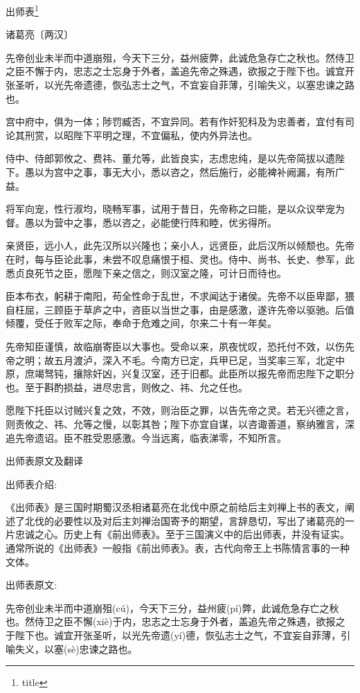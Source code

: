 \documentclass[]{ctexart}
\begin{document}
	出师表\footnote{title}
	
	\label{section:author}诸葛亮〔两汉〕
	
	先帝创业未半而中道崩殂，今天下三分，益州疲弊，此诚危急存亡之秋也。然侍卫之臣不懈于内，忠志之士忘身于外者，盖追先帝之殊遇，欲报之于陛下也。诚宜开张圣听，以光先帝遗德，恢弘志士之气，不宜妄自菲薄，引喻失义，以塞忠谏之路也。
	
	宫中府中，俱为一体；陟罚臧否，不宜异同。若有作奸犯科及为忠善者，宜付有司论其刑赏，以昭陛下平明之理，不宜偏私，使内外异法也。
	
	侍中、侍郎郭攸之、费祎、董允等，此皆良实，志虑忠纯，是以先帝简拔以遗陛下。愚以为宫中之事，事无大小，悉以咨之，然后施行，必能裨补阙漏，有所广益。
	
	将军向宠，性行淑均，晓畅军事，试用于昔日，先帝称之曰能，是以众议举宠为督。愚以为营中之事，悉以咨之，必能使行阵和睦，优劣得所。
	
	亲贤臣，远小人，此先汉所以兴隆也；亲小人，远贤臣，此后汉所以倾颓也。先帝在时，每与臣论此事，未尝不叹息痛恨于桓、灵也。侍中、尚书、长史、参军，此悉贞良死节之臣，愿陛下亲之信之，则汉室之隆，可计日而待也。
	
	臣本布衣，躬耕于南阳，苟全性命于乱世，不求闻达于诸侯。先帝不以臣卑鄙，猥自枉屈，三顾臣于草庐之中，咨臣以当世之事，由是感激，遂许先帝以驱驰。后值倾覆，受任于败军之际，奉命于危难之间，尔来二十有一年矣。
	
	先帝知臣谨慎，故临崩寄臣以大事也。受命以来，夙夜忧叹，恐托付不效，以伤先帝之明；故五月渡泸，深入不毛。今南方已定，兵甲已足，当奖率三军，北定中原，庶竭驽钝，攘除奸凶，兴复汉室，还于旧都。此臣所以报先帝而忠陛下之职分也。至于斟酌损益，进尽忠言，则攸之、祎、允之任也。
	
	愿陛下托臣以讨贼兴复之效，不效，则治臣之罪，以告先帝之灵。若无兴德之言，则责攸之、祎、允等之慢，以彰其咎；陛下亦宜自谋，以咨诹善道，察纳雅言，深追先帝遗诏。臣不胜受恩感激。今当远离，临表涕零，不知所言。
	
	
	出师表原文及翻译
	
	出师表介绍:
	
	《出师表》是三国时期蜀汉丞相诸葛亮在北伐中原之前给后主刘禅上书的表文，阐述了北伐的必要性以及对后主刘禅治国寄予的期望，言辞恳切，写出了诸葛亮的一片忠诚之心。历史上有《前出师表》。至于三国演义中的后出师表，并没有证实。通常所说的《出师表》一般指《前出师表》。表，古代向帝王上书陈情言事的一种文体。
	
	出师表原文:
	
	先帝创业未半而中道崩殂(cú)，今天下三分，益州疲(pí)弊，此诚危急存亡之秋也。然侍卫之臣不懈(xiè)于内，忠志之士忘身于外者，盖追先帝之殊遇，欲报之于陛下也。诚宜开张圣听，以光先帝遗(yí)德，恢弘志士之气，不宜妄自菲薄，引喻失义，以塞(sè)忠谏之路也。
	
\end{document}

